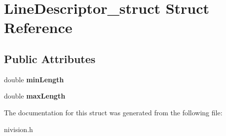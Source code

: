 \hypertarget{structLineDescriptor__struct}{\section{\-Line\-Descriptor\-\_\-struct \-Struct \-Reference}
\label{structLineDescriptor__struct}
}
\subsection*{\-Public \-Attributes}
\begin{DoxyCompactItemize}
\item 
\hypertarget{structLineDescriptor__struct_a34386d166f65582c115c9c1a35fc89b9}{double {\bfseries min\-Length}}\label{structLineDescriptor__struct_a34386d166f65582c115c9c1a35fc89b9}

\item 
\hypertarget{structLineDescriptor__struct_a96536a3511185a8f0efec34c97ff1af8}{double {\bfseries max\-Length}}\label{structLineDescriptor__struct_a96536a3511185a8f0efec34c97ff1af8}

\end{DoxyCompactItemize}


\-The documentation for this struct was generated from the following file\-:\begin{DoxyCompactItemize}
\item 
nivision.\-h\end{DoxyCompactItemize}
